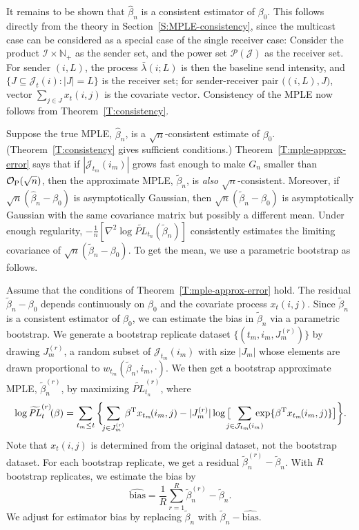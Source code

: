 \documentclass[final]{statsoc}
\begin{document}
It remains to be shown that $\hat \beta_n$ is a consistent estimator of
$\beta_0$.  This follows directly from the theory in Section~\ref{S:MPLE-consistency},
since the multicast case can be considered as a special case of
the single receiver case:  Consider the product $\mathcal{I} \times \mathbb{N}_+$
as the sender set, and the power set $\mathcal{P}(\mathcal{J})$ as the
receiver set.  For sender $(i,L)$, the process $\bar \lambda(i ; L)$ is then the
baseline send intensity, and $\{ J \subseteq \mathcal{J}_t(i) : |J| = L\}$ is the receiver set; for
sender-receiver pair $\big((i,L), J\big)$, vector $\sum_{j \in J} x_t(i,j)$ is
the covariate vector.  Consistency of the MPLE now follows from
Theorem~\ref{T:consistency}.



Suppose the true MPLE, $\hat \beta_n$, is a $\sqrt{n}$-consistent estimate of
$\beta_0$. (Theorem~\ref{T:consistency} gives sufficient conditions.)
Theorem~\ref{T:mple-approx-error} says that if
$|\mathcal{J}_{t_m}(i_m)|$ grows fast enough to make $G_n$ smaller than
$\mathcal{O}_\text{P}(\sqrt{n})$, then the approximate MPLE, $\tilde \beta_n$, is \emph{also}
$\sqrt{n}$-consistent.
Moreover, if $\sqrt{n}(\hat \beta_n - \beta_0)$ is asymptotically Gaussian,
then $\sqrt{n}(\tilde \beta_n - \beta_0)$ is asymptotically Gaussian with
the same covariance matrix but possibly a different mean.
Under enough regularity,
\(
    -\tfrac{1}{n} [
        \nabla^2 \log \widetilde{\mathit{PL}}_{t_n}(\tilde \beta_n)
    ]
\)
consistently estimates the limiting covariance
of $\sqrt{n}(\tilde \beta_n - \beta_0)$.  To get the mean, we use
a parametric bootstrap as follows.

Assume that the conditions of Theorem~\ref{T:mple-approx-error} hold.
The residual $\tilde \beta_n - \beta_0$ depends continuously on $\beta_0$
and the covariate process $x_t(i,j)$.  Since $\tilde \beta_n$ is a consistent
estimator of $\beta_0$, we can estimate the bias in $\tilde \beta_n$ via
a parametric bootstrap.  We generate a bootstrap replicate dataset
$\{ (t_m, i_m, J_m^{(r)}) \}$ by drawing $J_m^{(r)}$, a random subset
of $\mathcal{J}_{t_m}(i_m)$ with size $|J_m|$ whose elements are drawn
proportional to $w_{t_m}(\tilde \beta_n, i_m, \cdot)$.
We then get a bootstrap approximate MPLE, $\tilde \beta_n^{(r)}$, by
maximizing $\widetilde{\mathit{PL}}_{t_n}^{(r)}$, where
\[
    \log \widetilde{\mathit{PL}}_{t}^{(r)}\!(\beta) \\
        =
        \sum_{t_m \leq t}
        \bigg\{\!\!
            \sum_{j \in J_m^{(r)}}\!
                \beta^\trans x_{t_m}\!(i_m, j)
            -
            |J_m^{(r)}|\log\big[
                \!\!\!\!
                \sum_{j \in \mathcal{J}_{t_m}\!(i_m)}\!\!\!\!\!\!
                    \exp\{ \beta^\trans x_{t_m}\!(i_m, j)\}
            \big]
        \bigg\}.
\]
Note that $x_t(i,j)$ is determined from the original dataset, not the
bootstrap dataset.  For each bootstrap replicate, we get a residual
$\tilde \beta_n^{(r)} - \tilde \beta_n$.  With $R$ bootstrap
replicates, we estimate the bias by
\[
    \widehat{\mathrm{bias}}
        =
            \frac{1}{R} \sum_{r=1}^{R} \tilde \beta_n^{(r)} - \tilde \beta_n.
\]
We adjust for estimator bias by replacing $\tilde \beta_n$ with
$\tilde \beta_n - \widehat{\mathrm{bias}}$.
\end{document}
